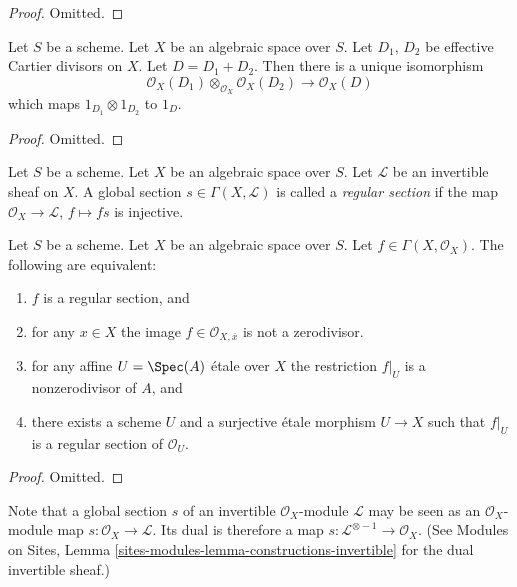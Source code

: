 \begin{proof}
Omitted.
\end{proof}

\begin{lemma}
\label{lemma-invertible-sheaf-sum-effective-Cartier-divisors}
Let $S$ be a scheme. Let $X$ be an algebraic space over $S$.
Let $D_1$, $D_2$ be effective Cartier divisors on $X$.
Let $D = D_1 + D_2$.
Then there is a unique isomorphism
$$
\mathcal{O}_X(D_1) \otimes_{\mathcal{O}_X} \mathcal{O}_X(D_2)
\longrightarrow
\mathcal{O}_X(D)
$$
which maps $1_{D_1} \otimes 1_{D_2}$ to $1_D$.
\end{lemma}

\begin{proof}
Omitted.
\end{proof}

\begin{definition}
\label{definition-regular-section}
Let $S$ be a scheme. Let $X$ be an algebraic space over $S$.
Let $\mathcal{L}$ be an invertible sheaf on $X$.
A global section $s \in \Gamma(X, \mathcal{L})$ is called a
{\it regular section} if the map $\mathcal{O}_X \to \mathcal{L}$,
$f \mapsto fs$ is injective.
\end{definition}

\begin{lemma}
\label{lemma-regular-section-structure-sheaf}
Let $S$ be a scheme.
Let $X$ be an algebraic space over $S$.
Let $f \in \Gamma(X, \mathcal{O}_X)$.
The following are equivalent:
\begin{enumerate}
\item $f$ is a regular section, and
\item for any $x \in X$ the image $f \in \mathcal{O}_{X, \overline{x}}$
is not a zerodivisor.
\item for any affine $U = \Spec(A)$ \'etale over $X$
the restriction $f|_U$ is a nonzerodivisor of $A$, and
\item there exists a scheme $U$ and a surjective \'etale morphism
$U \to X$ such that $f|_U$ is a regular section of $\mathcal{O}_U$.
\end{enumerate}
\end{lemma}

\begin{proof}
Omitted.
\end{proof}

\noindent
Note that a global section $s$ of an invertible $\mathcal{O}_X$-module
$\mathcal{L}$ may be seen as an $\mathcal{O}_X$-module map
$s : \mathcal{O}_X \to \mathcal{L}$. Its dual is therefore a
map $s : \mathcal{L}^{\otimes -1} \to \mathcal{O}_X$.
(See Modules on Sites, Lemma \ref{sites-modules-lemma-constructions-invertible}
for the dual invertible sheaf.)

